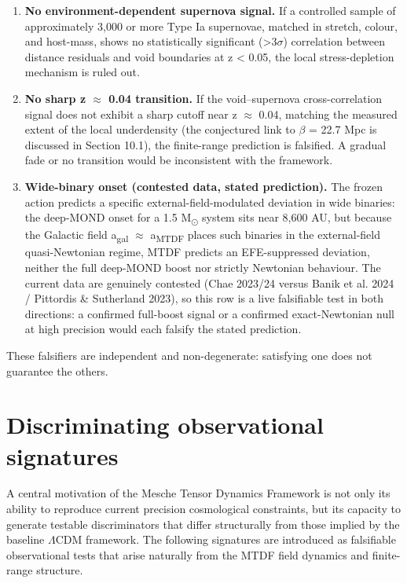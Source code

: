 \documentclass[11pt,a4paper]{article}
\begin{document}
\begin{enumerate}
  \item \textbf{No environment-dependent supernova signal.} If a controlled sample of approximately 3,000 or more Type Ia supernovae, matched in stretch, colour, and host-mass, shows no statistically significant (>3$\sigma$) correlation between distance residuals and void boundaries at z < 0.05, the local stress-depletion mechanism is ruled out.
  \item \textbf{No sharp z $\approx$ 0.04 transition.} If the void--supernova cross-correlation signal does not exhibit a sharp cutoff near z $\approx$ 0.04, matching the measured extent of the local underdensity (the conjectured link to $\beta$ = 22.7 Mpc is discussed in Section 10.1), the finite-range prediction is falsified. A gradual fade or no transition would be inconsistent with the framework.
  \item \textbf{Wide-binary onset (contested data, stated prediction).} The frozen action predicts a specific external-field-modulated deviation in wide binaries: the deep-MOND onset for a 1.5 M\textsubscript{$\odot$} system sits near 8,600 AU, but because the Galactic field a\textsubscript{gal} $\approx$ a\textsubscript{MTDF} places such binaries in the external-field quasi-Newtonian regime, MTDF predicts an EFE-suppressed deviation, neither the full deep-MOND boost nor strictly Newtonian behaviour. The current data are genuinely contested (Chae 2023/\allowbreak{}24 versus Banik et al. 2024 / Pittordis \& Sutherland 2023), so this row is a live falsifiable test in both directions: a confirmed full-boost signal or a confirmed exact-Newtonian null at high precision would each falsify the stated prediction.
\end{enumerate}

These falsifiers are independent and non-degenerate: satisfying one does not guarantee the others.

\section{Discriminating observational signatures}
\label{sec:sec10}
A central motivation of the Mesche Tensor Dynamics Framework is not only its ability to reproduce current precision cosmological constraints, but its capacity to generate testable discriminators that differ structurally from those implied by the baseline $\Lambda$CDM framework. The following signatures are introduced as falsifiable observational tests that arise naturally from the MTDF field dynamics and finite-range structure.
\end{document}
